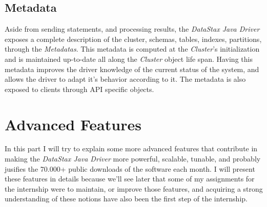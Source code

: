 \documentclass[a4paper]{report}
\newcommand{\djd}{\emph{DataStax Java Driver\xspace}}
\begin{document}
\subsection{Metadata}
Aside from sending statements, and processing results, the \djd{} exposes a complete description of the cluster, schemas, tables, indexes, partitions, through the \emph{Metadatas}. This metadata is computed at the \emph{Cluster}'s initialization and is maintained up-to-date all along the \emph{Cluster} object life span. Having this metadata improves the driver knowledge of the current status of the system, and allows the driver to adapt it's behavior according to it. The metadata is also exposed to clients through API specific objects.



\section{Advanced Features}
In this part I will try to explain some more advanced features that contribute in making the \djd{} more powerful, scalable, tunable, and probably jusifies the 70.000+ public downloads of the software each month. I will present these features in details because we'll see later that some of my assignments for the internship were to maintain, or improve those features, and acquiring a strong understanding of these notions have also been the first step of the internship.
\end{document}
